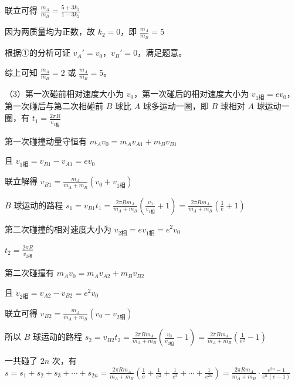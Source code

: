 \documentclass[\gkver]{gaokaozhenti}
\begin{document}
\begin{enumerate}
{联立可得 $\frac{m_{A}}{m_{B}}=\frac{5+3k_{2}}{1-3k_{2}}$

因为两质量均为正数，故 $k_{2}=0$，即 $\frac{m_{A}}{m_{B}}=5$

根据①的分析可证 $v_{A}' = v_{0}$，$v_{B}' = 0$，满足题意。

综上可知 $\frac{m_{A}}{m_{B}}=2$ 或 $\frac{m_{A}}{m_{B}}=5$。

（3）第一次碰前相对速度大小为 $v_{0}$，第一次碰后的相对速度大小为 $v_{1\text{相}} = ev_{0}$，第一次碰后与第二次相碰前 $B$ 球比 $A$ 球多运动一圈，即 $B$ 球相对 $A$ 球运动一圈，有 $t_{1}=\frac{2\pi R}{v_{1\text{相}}}$

第一次碰撞动量守恒有 $m_{A}v_{0}=m_{A}v_{A1}+m_{B}v_{B1}$

且 $v_{1\text{相}}=v_{B1}-v_{A1}=ev_{0}$

联立解得 $v_{B1}=\frac{m_{A}}{m_{A}+m_{B}}\left(v_{0}+v_{1\text{相}}\right)$

$B$ 球运动的路程 $s_{1}=v_{B1}t_{1}=\frac{2\pi Rm_{A}}{m_{A}+m_{B}}\left(\frac{v_{0}}{v_{1\text{相}}}+1\right)=\frac{2\pi Rm_{A}}{m_{A}+m_{B}}\left(\frac{1}{e}+1\right)$

第二次碰撞的相对速度大小为 $v_{2\text{相}}=ev_{1\text{相}}=e^{2}v_{0}$

$t_{2}=\frac{2\pi R}{v_{2\text{相}}}$

第二次碰撞有 $m_{A}v_{0}=m_{A}v_{A2}+m_{B}v_{B2}$

且 $v_{2\text{相}}=v_{A2}-v_{B2}=e^{2}v_{0}$

联立可得 $v_{B2}=\frac{m_{A}}{m_{A}+m_{B}}\left(v_{0}-v_{2\text{相}}\right)$

所以 $B$ 球运动的路程 $s_{2}=v_{B2}t_{2}=\frac{2\pi Rm_{A}}{m_{A}+m_{B}}\left(\frac{v_{0}}{v_{2\text{相}}}-1\right)=\frac{2\pi Rm_{A}}{m_{A}+m_{B}}\left(\frac{1}{e^{2}}-1\right)$

一共碰了 $2n$ 次，有 $s=s_{1}+s_{2}+s_{3}+\cdots+s_{2n}=\frac{2\pi Rm_{A}}{m_{A}+m_{B}}\left(\frac{1}{e}+\frac{1}{e^{2}}+\frac{1}{e^{3}}+\cdots+\frac{1}{e^{2n}}\right)=\frac{2\pi Rm_{A}}{m_{A}+m_{B}}\cdot\frac{e^{2n}-1}{e^{n}(e-1)}$
}

\end{enumerate}
\end{document}

